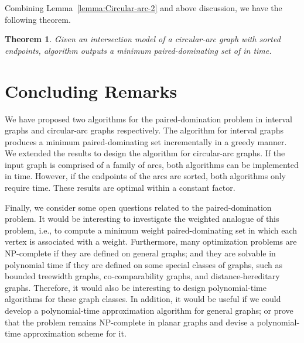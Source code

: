 \documentclass[12pt]{article}
\newtheorem{theorem}{Theorem}
\begin{document}
Combining Lemma~\ref{lemma:Circular-arc-2} and above discussion,
we have the following theorem.

\begin{theorem} \label{theorem:interval} Given an intersection
model  of a circular-arc graph  with sorted endpoints,
algorithm  outputs a minimum paired-dominating set 
of  in  time.
\end{theorem}

\section{Concluding Remarks  \label{section:conclusion}}
We have proposed two algorithms for the paired-domination problem in interval graphs and circular-arc graphs respectively. The algorithm for interval graphs produces a minimum paired-dominating set incrementally in a greedy manner. We extended the results to design the algorithm for circular-arc graphs. If the input graph is comprised of a family of  arcs, both algorithms can be implemented in  time. However, if the endpoints of the arcs are sorted, both algorithms only require  time. These results are optimal within a constant factor.

Finally, we consider some open questions related to the paired-domination problem. It would be interesting to investigate the weighted analogue of this problem, i.e., to compute a minimum weight paired-dominating set in which each vertex is associated with a weight. Furthermore, many optimization problems are NP-complete if they are defined on general graphs; and they are solvable in polynomial time if they are defined on some special classes of graphs, such as bounded treewidth graphs, co-comparability graphs, and distance-hereditary graphs. Therefore, it would also be interesting to design polynomial-time algorithms for these graph classes. In addition, it would be useful if we could develop a polynomial-time approximation algorithm for general graphs; or prove that the problem remains NP-complete in planar graphs and devise a polynomial-time approximation scheme for it.

\small


\end{document}
